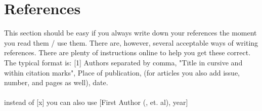 \section{References}
This section should be easy if you always write down your references the moment you read them / use them. There are, however, several acceptable ways of writing references. There are plenty of instructions online to help you get these correct. The typical format is:
[1] Authors separated by comma, "Title in cursive and within citation marks", Place of publication, (for articles you also add issue, number, and pages as well), date.  
\\ \\ 
instead of [x] you can also use [First Author (, et. al), year]

